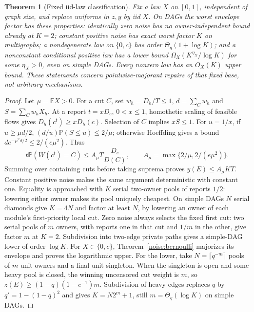 \documentclass[11pt]{article}
\newtheorem{theorem}{Theorem}[section]
\theoremstyle{definition}\newtheorem{definition}[theorem]{Definition}
\theoremstyle{remark}\newtheorem{remark}[theorem]{Remark}
\newcommand{\E}{\mathbb E}
\newcommand{\Prob}{\mathbb P}
\begin{document}
\begin{theorem}[Fixed iid-law classification]\label{noise:classification}
Fix a law $X$ on $[0,1]$, independent of graph size, and replace uniforms
in $z,y$ by iid $X$. On DAGs the worst envelope factor has these properties:
identically zero noise has no owner-independent bound already at $K=2$;
constant positive noise has exact worst factor $K$ on multigraphs;
a nondegenerate law on $\{0,c\}$ has order $\Theta_q(1+\log K)$;
and a nonconstant conditional positive law has a lower bound
$\Omega_X(K^{\eta_X}/\log K)$ for some $\eta_X>0$, even on simple DAGs.
Every nonzero law has an $O_X(K)$ upper bound. These statements concern
pointwise-majorant repairs of that fixed base, not arbitrary mechanisms.
\end{theorem}
\begin{proof}
Let $\mu=\E X>0$. For a cut $C$, set $w_h=D_h/T\le1$,
$d=\sum_Cw_h$ and $S=\sum_Cw_hX_h$. At a report $t=xD_e$, $0<x\le1$,
homothetic scaling of feasible flows gives $D_h(c^t)\ge xD_h(c)$.
Selection of $C$ implies $xS\le1$. For $u=1/x$, if $u\ge\mu d/2$,
$(d/u)\Prob(S\le u)\le2/\mu$; otherwise Hoeffding gives a bound
$d e^{-\mu^2d/2}\le2/(e\mu^2)$. Thus
\[
 t\Prob(W(c^t)=C)\le A_\mu T\frac{D_e}{D(C)},\qquad
 A_\mu=\max\{2/\mu,2/(e\mu^2)\}.
\]
Summing over containing cuts before taking suprema proves $y(E)\le A_\mu KT$.
Constant positive noise makes the same argument deterministic with constant
one. Equality is approached with $K$ serial two-owner pools of reports
$1/2$: lowering either owner makes its pool uniquely cheapest. On simple
DAGs $N$ serial diamonds give $K=4N$ and factor at least $N$, by lowering
an owner of each module's first-priority local cut.
Zero noise always selects the fixed first cut: two serial pools of $m$
owners, with reports one in that cut and $1/m$ in the other, give factor
$m$ at $K=2$. Subdivision into two-edge private paths gives a simple-DAG
lower of order $\log K$.
For $X\in\{0,c\}$, Theorem~\ref{noise:bernoulli} majorizes its envelope
and proves the logarithmic upper. For the lower, take
$N=\lceil q^{-m}\rceil$ pools of $m$ unit owners and a final unit singleton.
When the singleton is open and some heavy pool is closed, the winning
uncensored cut weight is $m$, so $z(E)\ge(1-q)(1-e^{-1})m$.
Subdivision of heavy edges replaces $q$ by $q'=1-(1-q)^2$ and gives
$K=N2^m+1$, still $m=\Theta_q(\log K)$ on simple DAGs.


\end{proof}
\end{document}
